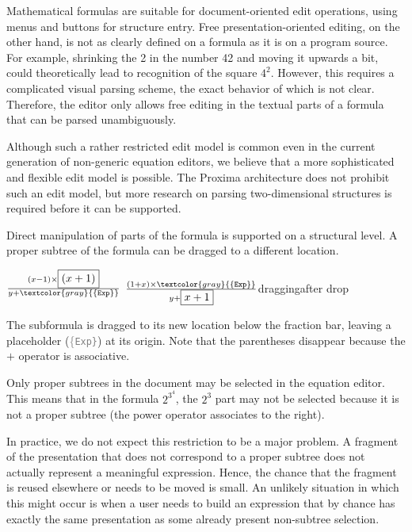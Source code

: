 
Mathematical formulas are suitable for document-oriented edit operations, using menus and buttons for structure entry. Free presentation-oriented editing, on the other hand, is not as clearly defined on a formula as it is on a program source. For example, shrinking the 2 in the number 42 and moving it upwards a bit, could theoretically lead to recognition of the square $4^2$. However, this requires a complicated visual parsing scheme, the exact behavior of which is not clear. Therefore, the editor only allows free editing in the textual parts of a formula that can be parsed unambiguously.

Although such a rather restricted edit model is common even in the current generation of non-generic equation editors, we believe that a more sophisticated and flexible edit model is possible. The Proxima architecture does not prohibit such an edit model, but more research on parsing two-dimensional structures is required before it can be supported.


Direct manipulation of parts of the formula is supported on a structural level. A proper subtree of the formula can be dragged to a different location.

\editScreenshot
{$ \frac{(x-1)\times{\framebox{$(x+1)$}}}{y + \textcolor{gray}{\{\tt Exp\}}}    $}
{$ \frac{(1+x)\times{\textcolor{gray}{\{\tt Exp\}}} }{y + \framebox{$x+1$}}  $}{dragging}{after drop}

The subformula is dragged to its new location below the fraction bar, leaving a placeholder (\textcolor{gray}{\{\tt Exp\}}) at its origin. Note that the parentheses disappear because the $+$ operator is associative. 

Only proper subtrees in the document may be selected in the equation editor. This means that in the formula $2^{3^4}$, 
the $2^3$ part may not be selected because it is not a proper subtree (the power operator associates to the right). 

In practice, we do not expect this restriction to be a major problem. A fragment of the presentation that does not correspond to a proper subtree does not actually represent a meaningful expression. Hence, the chance that the fragment is reused elsewhere or needs to be moved is small. An unlikely situation in which this might occur is when a user needs to build an expression that by chance has exactly the same presentation as some already present non-subtree selection.

